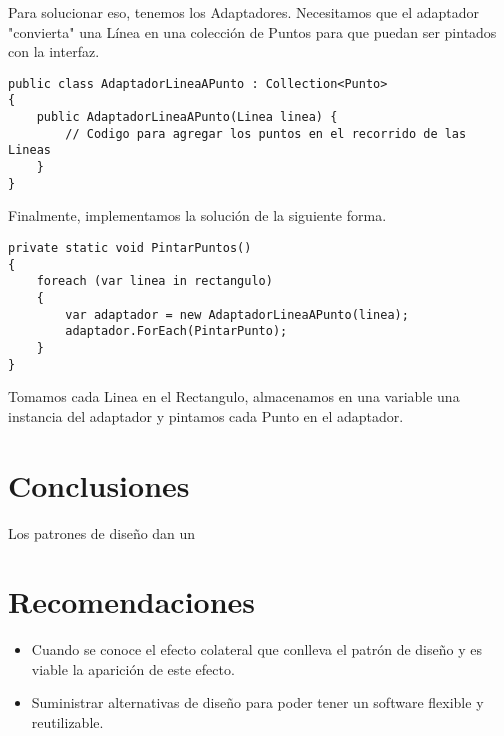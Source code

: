 \documentclass[twoside,twocolumn]{article}
\begin{document}
Para solucionar eso, tenemos los Adaptadores. Necesitamos que el adaptador "convierta" una Línea en una colección de Puntos para que puedan ser pintados con la interfaz.
\lstset{style=sharpc}
\begin{lstlisting}
public class AdaptadorLineaAPunto : Collection<Punto>
{
    public AdaptadorLineaAPunto(Linea linea) {
        // Codigo para agregar los puntos en el recorrido de las Lineas
    }
}
\end{lstlisting}

Finalmente, implementamos la solución de la siguiente forma.
\lstset{style=sharpc}
\begin{lstlisting}
private static void PintarPuntos()
{
    foreach (var linea in rectangulo)
    {
        var adaptador = new AdaptadorLineaAPunto(linea);
        adaptador.ForEach(PintarPunto);
    }  
}
\end{lstlisting}

Tomamos cada Linea en el Rectangulo, almacenamos en una variable una instancia del adaptador y pintamos cada Punto en el adaptador.



\section{Conclusiones}

Los patrones de diseño dan un


\section{Recomendaciones}


\begin{itemize}
\item Cuando se conoce el efecto colateral que conlleva el patrón de diseño y es viable la aparición de este efecto.
\item Suministrar alternativas de diseño para poder tener un software flexible y reutilizable.

\end{itemize}
\end{document}
